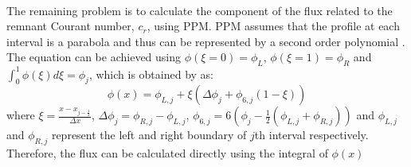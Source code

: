 \paragraph{}
The remaining problem is to calculate the component of the flux related to the remnant Courant number, $c_r$, using PPM. PPM assumes that the profile at each interval is a parabola and thus can be represented by a second order polynomial \citep{Colella1984}. The equation can be achieved using $\phi(\xi = 0) = \phi_L$, $\phi(\xi = 1) = \phi_R$ and $ \int^{1}_{0} \phi (\xi) d\xi = \phi_j  $, which is obtained by \citet{Colella1984} as:
\begin{equation} \label{eq:2.4} 
\phi(x) = \phi_{L,j} + \xi (\Delta \phi_j + \phi_{6,j}(1-\xi)) 
\end{equation} 
where $ \xi = \frac{x-x_{j-\frac{1}{2}}}{\Delta x} $, $ \Delta \phi_j = \phi_{R,j} - \phi_{L,j} $, $ \phi_{6,j} = 6(\phi_j-\frac{1}{2}(\phi_{L,j}+\phi_{R,j})) $ and $\phi_{L,j}$ and $\phi_{R,j}$ represent the left and right boundary of $j$th interval respectively. Therefore, the flux can be calculated directly using the integral of $\phi(x)$

